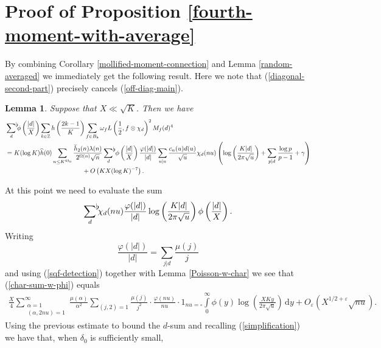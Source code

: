 \documentclass[a4paper,10pt,twoside]{amsart}
\newtheorem{lemma}[theorem]{Lemma}
\theoremstyle{definition}
\numberwithin{equation}{section}
\newcommand\Z{\mathbb{Z}}
\newcommand\eps{\varepsilon}
\renewcommand\:{\colon}
\newcommand{\sumflat}{\mathop{{\sum}^{\raisebox{-3pt}{\makebox[0pt][l]{$\flat$}}}}}
\begin{document}
\section{Proof of Proposition \ref{fourth-moment-with-average}}

\noindent By combining Corollary \ref{mollified-moment-connection} and Lemma \ref{random-averaged} we immediately get the following result. Here we note that (\ref{diagonal-second-part}) precisely cancels (\ref{off-diag-main}).

\begin{lemma}
Suppose that $X\ll\sqrt K$. Then we have
\begin{align*}
&\sumflat_{d}\phi\left(\frac{|d|}X\right)\sum_{k\in\Z}h\left(\frac{2k-1}K\right)\sum_{f\in B_k}\omega_f L\left(\frac12,f\otimes\chi_d\right)^2M_f(d)^4\\
&=K(\log K)\widehat h(0)\sum_{n\leq K^{4\delta_0}}\frac{\breve h_2(n)\lambda(n)}{2^{\Omega(n)}\sqrt n}\sumflat_{d}\,\phi\left(\frac{|d|}X\right)\frac{\varphi(|d|)}{|d|}\sum_{u|n}\frac{c_n(u)d(u)}{\sqrt u}\chi_d(nu)\left(\log\left(\frac{K|d|}{2\pi\sqrt u}\right)+\sum_{p|d}\frac{\log p}{p-1}+\gamma\right)\\
&\qquad\qquad\qquad\qquad\qquad\qquad+O\left(KX(\log K)^{-7}\right).
\end{align*}
\end{lemma}
\noindent At this point we need to evaluate the sum
\begin{align}\label{char-sum-w-phi}
\sumflat_{d}\chi_d(nu)\frac{\varphi(|d|)}{|d|}\log\left(\frac{K|d|}{2\pi\sqrt u}\right)\phi\left(\frac{|d|}X\right).
\end{align}
Writing 
\[ 
\frac{\varphi(|d|)}{|d|}=\sum_{j|d}\frac{\mu(j)}j
\]
and using (\ref{sqf-detection}) together with Lemma \ref{Poisson-w-char} we see that (\ref{char-sum-w-phi}) equals
\begin{align*}
\frac X4\sum_{\substack{\alpha=1\\
(\alpha,2nu)=1}}^\infty\frac{\mu(\alpha)}{\alpha^2}\sum_{(j,2)=1}\frac{\mu(j)}{j^2}\cdot\frac{\varphi(nu)}{nu}\cdot1_{nu=\square}\int\limits_0^\infty\phi(y)\log\left(\frac{XKy}{2\pi\sqrt u}\right)\,\mathrm d y+O_\eps\left(X^{1/2+\eps}\sqrt{nu}\right).
\end{align*}
Using the previous estimate to bound the $d$-sum and recalling (\ref{simplification}) we have that, when $\delta_0$ is sufficiently small, 
\end{document}
